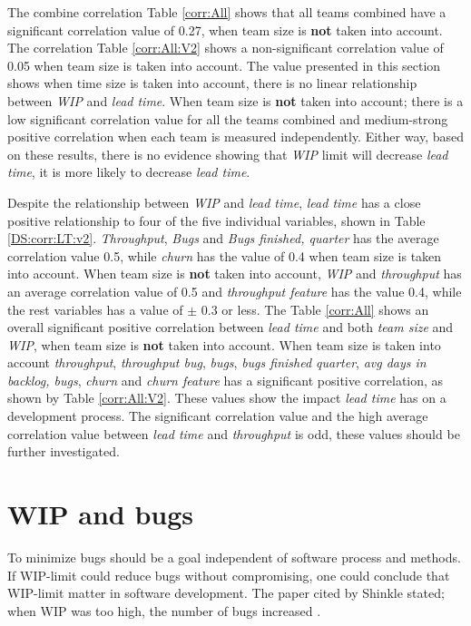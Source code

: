 \documentclass[UKenglish]{ifimaster}  %
\begin{document}
The combine correlation Table \ref{corr:All} shows that all teams combined have a significant correlation value of 0.27, when team size is \textbf{not} taken into account.  The correlation Table \ref{corr:All:V2} shows a non-significant correlation value of 0.05 when team size is taken into account. The value presented in this section shows when time size is taken into account, there is no linear relationship between \textit{WIP} and \textit{lead time}. When team size is \textbf{not} taken into account; there is a low significant correlation value for all the teams combined and medium-strong positive correlation when each team is measured independently. Either way, based on these results, there is no evidence showing that \textit{WIP} limit will decrease \textit{lead time}, it is more likely to decrease \textit{lead time}.


Despite the relationship between \textit{WIP} and \textit{lead time},  \textit{lead time} has a close positive relationship to four of the five individual variables, shown in Table \ref{DS:corr:LT:v2}. \textit{Throughput}, \textit{Bugs} and  \textit{Bugs finished, quarter}  has the average correlation value 0.5, while \textit{churn} has the value of 0.4 when team size is taken into account. When team size is \textbf{not} taken into account, \textit{WIP} and \textit{throughput} has an average correlation value of 0.5 and \textit{throughput feature} has the value 0.4, while the rest variables has a value of $\pm$ 0.3 or less. The Table \ref{corr:All} shows an overall significant positive correlation between \textit{lead time} and both \textit{team size} and \textit{WIP}, when team size is \textbf{not} taken into account. When team size is taken into account \textit{throughput}, \textit{throughput bug}, \textit{bugs}, \textit{bugs finished quarter}, \textit{avg days in backlog, bugs}, \textit{churn} and \textit{churn feature} has a significant positive correlation, as shown by Table \ref{corr:All:V2}. These values show the impact \textit{lead time} has on a development process.  The significant correlation value and the high average correlation value between \textit{lead time} and \textit{throughput} is odd, these values should be further investigated. 

\section{WIP and bugs}
To minimize bugs should be a goal independent of software process and methods. If WIP-limit could reduce bugs without compromising, one could conclude that WIP-limit matter in software development. The paper cited by Shinkle stated; when WIP was too high, the number of bugs increased  \parencite{Shinkle}.
\end{document}
